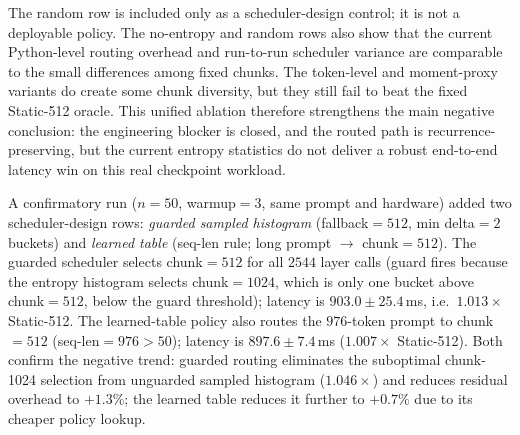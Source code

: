 The random row is included only as a scheduler-design control; it is not a deployable policy. The no-entropy and random rows also show that the current Python-level routing overhead and run-to-run scheduler variance are comparable to the small differences among fixed chunks. The token-level and moment-proxy variants do create some chunk diversity, but they still fail to beat the fixed Static-512 oracle. This unified ablation therefore strengthens the main negative conclusion: the engineering blocker is closed, and the routed path is recurrence-preserving, but the current entropy statistics do not deliver a robust end-to-end latency win on this real checkpoint workload.

A confirmatory run ($n{=}50$, warmup$=3$, same prompt and hardware) added two scheduler-design rows: \emph{guarded sampled histogram} (fallback$=512$, min delta$=2$ buckets) and \emph{learned table} (seq-len rule; long prompt $\to$ chunk$=512$). The guarded scheduler selects chunk$=512$ for all $2544$ layer calls (guard fires because the entropy histogram selects chunk$=1024$, which is only one bucket above chunk$=512$, below the guard threshold); latency is $903.0 \pm 25.4$\,ms, i.e.\ $1.013\times$ Static-512. The learned-table policy also routes the $976$-token prompt to chunk$=512$ (seq-len$=976 > 50$); latency is $897.6 \pm 7.4$\,ms ($1.007\times$ Static-512). Both confirm the negative trend: guarded routing eliminates the suboptimal chunk-1024 selection from unguarded sampled histogram ($1.046\times$) and reduces residual overhead to $+1.3\%$; the learned table reduces it further to $+0.7\%$ due to its cheaper policy lookup.

